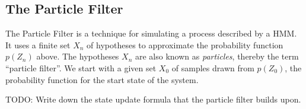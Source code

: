 \subsection*{The Particle Filter}
The Particle Filter is a technique for simulating a process described by a HMM. It uses a finite set $X_n$ of hypotheses to approximate the probability function $p(Z_n)$ above. The hypotheses $X_n$ are also known as \emph{particles}, thereby the term ``particle filter''. We start with a given set $X_0$ of samples drawn from $p(Z_0)$, the probability function for the start state of the system.

TODO: Write down the state update formula that the particle filter builds upon.
